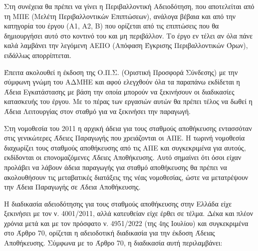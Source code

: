 \documentclass[12pt]{report}
\begin{document}
Στη συνέχεια θα πρέπει να γίνει η Περιβαλλοντική Αδειοδότηση, που αποτελείται από τη ΜΠΕ (Μελέτη Περιβαλλοντικών Επιπτώσεων), ανάλογα βέβαια και από την κατηγορία του έργου (Α1, Α2, Β) που ορίζεται
από τις επιπτώσεις που θα δημιουργήσει αυτό στο κοντινό του και μη περιβάλλον. Το έργο εν τέλει αν όλα πάνε καλά λαμβάνει την λεγόμενη ΑΕΠΟ (Απόφαση Έγκρισης Περιβαλλοντικών Όρων), ειδάλλως απορρίπτεται.

Έπειτα ακολουθεί η έκδοση της Ο.Π.Σ. (Οριστική Προσφορά Σύνδεσης) με την σύμφωνη γνώμη του ΑΔΜΗΕ και αφού ελεγχθούν όλα τα παραπάνω εκδίδεται η Άδεια Εγκατάστασης με βάση την οποία μπορούν να ξεκινήσουν οι διαδικασίες
κατασκευής του έργου. Με το πέρας των εργασιών αυτών θα πρέπει τέλος να δωθεί η Άδεια Λειτουργίας στον σταθμό για να ξεκινήσει την παραγωγή.

Στη νομοθεσία του 2011 η αρχική άδεια για τους σταθμούς αποθήκευσης εντασσόταν στις γενικώτερες Άδειες Παραγωγής που χρειάζονται οι ΑΠΕ. Η τωρινή νομοθεσία διαχωρίζει τους σταθμούς αποθήκευσης από τις ΑΠΕ και συγκεκριμένα 
για αυτούς, εκδίδονται οι επονομαζόμενες Άδειες Αποθήκευσης. Αυτό σημαίνει ότι όσοι είχαν προλάβει να λάβουν άδεια παραγωγής για σταθμό αποθήκευσης θα πρέπει να ακολουθήσουν τις μεταβατικές διατάξεις της νέας νομοθεσίας, 
ώστε να μετατρέψουν την Άδεια Παραγωγής σε Άδεια Αποθήκευσης.

Η διαδικασία αδειοδότησης για τους σταθμούς αποθήκευσης στην Ελλάδα είχε ξεκινήσει με τον ν. 4001/2011, αλλά κατευθείαν είχε έρθει σε τέλμα. Δέκα και πλέον χρόνια μετά και με τον πρόσφατο ν. 4951/2022 (της 4ης Ιουλίου) και 
συγκεκριμένα στο Άρθρο 70, ορίζεται η αδειοδοτική διαδικασία για την έκδοση Άδειας Αποθήκευσης. Σύμφωνα με το Άρθρο 70, η διαδικασία αυτή περιλαμβάνει:
\end{document}
